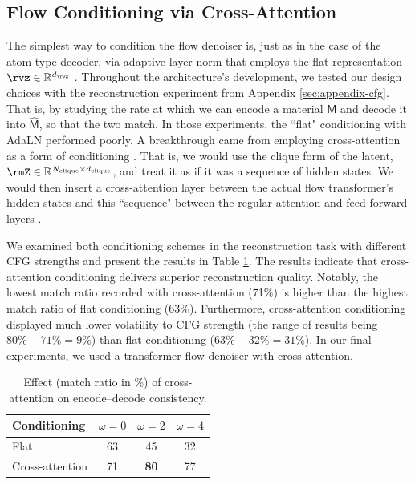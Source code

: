 \documentclass{article}
\theoremstyle{plain}
\theoremstyle{definition}
\theoremstyle{remark}
\begin{document}
\subsection{Flow Conditioning via Cross-Attention}
\label{appendix:cross-attention}
The simplest way to condition the flow denoiser is, just as in the case of the atom-type decoder, via adaptive layer-norm that employs the flat representation $\rvz\in\mathbb{R}^{d_{\rvz}}$ \citep[AdaLN]{peebles2023scalable}. 
Throughout the architecture's development, we tested our design choices with the reconstruction experiment from Appendix \ref{sec:appendix-cfg}.
That is, by studying the rate at which we can encode a material $\mathsf{M}$ and decode it into $\hat{\mathsf{M}}$, so that the two match.
In those experiments, the ``flat" conditioning with AdaLN performed poorly.
A breakthrough came from employing cross-attention as a form of conditioning \citep{vaswani2017attention}.
That is, we would use the clique form of the latent, $\rmZ\in\mathbb{R}^{N_{\text{clique}}\times d_{\text{clique}}}$, and treat it as if it was a sequence of hidden states.
We would then insert a cross-attention layer between the actual flow transformer's hidden states and this ``sequence" between the regular attention and feed-forward layers \citep{vaswani2017attention}.


We examined both conditioning schemes in the reconstruction task with different CFG strengths and present the results in Table \ref{tab:cross-attention}.
The results indicate that cross-attention conditioning delivers superior reconstruction quality. 
Notably, the lowest match ratio recorded with cross-attention (71\%) is higher than the highest match ratio of flat conditioning (63\%).
Furthermore, cross-attention conditioning displayed much lower volatility to CFG strength (the range of results being $80\%-71\%=9\%$) than flat conditioning ($63\%-32\%=31\%$). 
In our final experiments, we used a transformer flow denoiser with cross-attention. 

\begin{table}
\centering
\caption{Effect (match ratio in \%) of cross-attention on encode--decode consistency.}
\label{tab:cross-attention}
\begin{tabular}{l | c c c}
\toprule
Conditioning & $\omega=0$ & $\omega=2$ & $\omega=4$\\
\midrule
Flat & 63 & 45 & 32 \\
Cross-attention & 71 & \textbf{80} & 77 \\
\bottomrule
\end{tabular}
\end{table}
\end{document}
